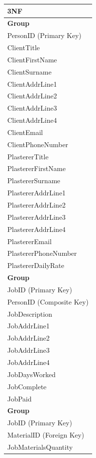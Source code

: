 \begin{flushleft}
    \begin{longtable}{|p{12cm}|}
                \hline
 			\textbf{3NF} \\ \hline
         \textbf{Group} \\ \hline
			PersonID (Primary Key) \\ 
         ClientTitle \\
			ClientFirstName \\
			ClientSurname \\
			ClientAddrLine1 \\
			ClientAddrLine2 \\
			ClientAddrLine3 \\
			ClientAddrLine4 \\
			ClientEmail \\
			ClientPhoneNumber \\
			PlastererTitle \\
			PlastererFirstName \\
			PlastererSurname \\
			PlastererAddrLine1 \\
			PlastererAddrLine2 \\
			PlastererAddrLine3 \\
			PlastererAddrLine4 \\
			PlastererEmail \\
			PlastererPhoneNumber \\
			PlastererDailyRate \\ \hline

			\textbf{Group} \\ \hline
			JobID (Primary Key) \\
			PersonID (Composite Key) \\
         JobDescription \\
			JobAddrLine1 \\
			JobAddrLine2 \\
			JobAddrLine3 \\
			JobAddrLine4 \\
			JobDaysWorked \\
			JobComplete \\
			JobPaid \\ \hline
		
			\textbf{Group} \\ \hline
			JobID (Primary Key) \\ 
			MaterialID (Foreign Key) \\
			JobMaterialsQuantity \\ \hline



\end{longtable}
\end{flushleft}
